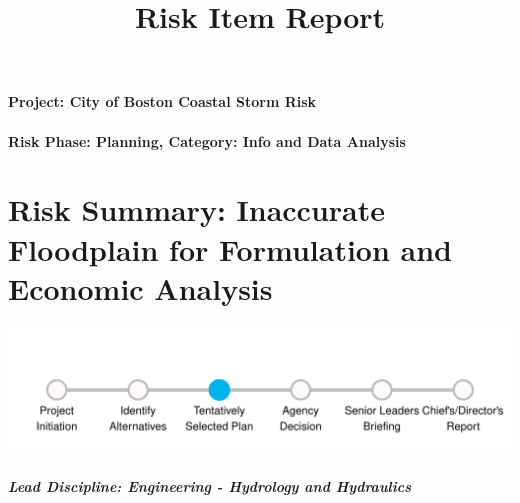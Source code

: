 \documentclass[
]{article}
\title{Risk Item Report}
\author{}
\date{\vspace{-2.5em}}
\begin{document}
\maketitle

\hypertarget{project-city-of-boston-coastal-storm-risk}{%
\paragraph{Project: City of Boston Coastal Storm
Risk}\label{project-city-of-boston-coastal-storm-risk}}

\hypertarget{risk-phase-planning-category-info-and-data-analysis}{%
\paragraph{Risk Phase: Planning, Category: Info and Data
Analysis}\label{risk-phase-planning-category-info-and-data-analysis}}

\hypertarget{risk-summary-inaccurate-floodplain-for-formulation-and-economic-analysis}{%
\section{Risk Summary: Inaccurate Floodplain for Formulation and
Economic
Analysis}\label{risk-summary-inaccurate-floodplain-for-formulation-and-economic-analysis}}

\begin{center}\includegraphics{RiskItemReport_files/figure-latex/milestoneplot-1} \end{center}

\hypertarget{lead-discipline-engineering---hydrology-and-hydraulics}{%
\subparagraph{\texorpdfstring{\textbf{Lead Discipline:} Engineering -
Hydrology and
Hydraulics}{Lead Discipline: Engineering - Hydrology and Hydraulics}}\label{lead-discipline-engineering---hydrology-and-hydraulics}}
\end{document}
